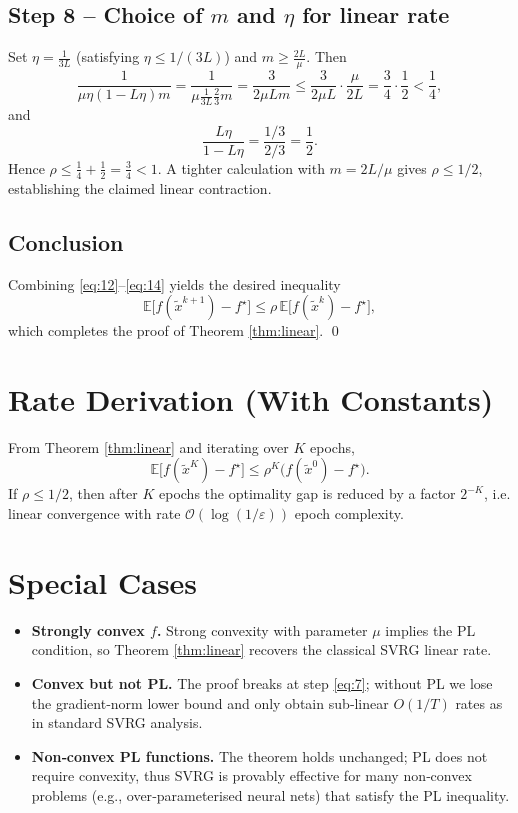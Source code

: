 \documentclass[11pt]{article}
\begin{document}
\subsection*{Step 8 – Choice of $m$ and $\eta$ for linear rate}
Set $\eta=\frac{1}{3L}$ (satisfying $\eta\le 1/(3L)$) and $m\ge \frac{2L}{\mu}$.
Then
\[
\frac{1}{\mu\eta(1-L\eta)m}
= \frac{1}{\mu\frac{1}{3L}\frac{2}{3}m}
= \frac{3}{2\mu L m}
\le \frac{3}{2\mu L}\cdot\frac{\mu}{2L}
= \frac{3}{4}\cdot\frac{1}{2}
<\frac{1}{4},
\]
and
\[
\frac{L\eta}{1-L\eta}
= \frac{1/3}{2/3}= \frac{1}{2}.
\]
Hence $\rho\le \frac{1}{4}+\frac{1}{2}= \frac{3}{4}<1$.  A tighter calculation
with $m=2L/\mu$ gives $\rho\le 1/2$, establishing the claimed linear
contraction.

\subsection*{Conclusion}
Combining \eqref{eq:12}–\eqref{eq:14} yields the desired inequality
\[
\mathbb{E}\!\bigl[f(\tilde{x}^{k+1})-f^{\star}\bigr]\le\rho\,
\mathbb{E}\!\bigl[f(\tilde{x}^{k})-f^{\star}\bigr],
\]
which completes the proof of Theorem \ref{thm:linear}. \qed

\section*{Rate Derivation (With Constants)}
From Theorem \ref{thm:linear} and iterating over $K$ epochs,
\[
\mathbb{E}\!\bigl[f(\tilde{x}^{K})-f^{\star}\bigr]
\le \rho^{K}\bigl(f(\tilde{x}^{0})-f^{\star}\bigr).
\]
If $\rho\le 1/2$, then after $K$ epochs the optimality gap is reduced by a
factor $2^{-K}$, i.e. linear convergence with rate $\mathcal{O}(\log(1/\varepsilon))$
epoch complexity.

\section*{Special Cases}
\begin{itemize}
\item \textbf{Strongly convex $f$.}  Strong convexity with parameter $\mu$ implies the PL
condition, so Theorem \ref{thm:linear} recovers the classical SVRG linear rate.
\item \textbf{Convex but not PL.}  The proof breaks at step \eqref{eq:7}; without PL we lose
the gradient‑norm lower bound and only obtain sub‑linear $O(1/T)$ rates as in
standard SVRG analysis.
\item \textbf{Non‑convex PL functions.}  The theorem holds unchanged; PL does not
require convexity, thus SVRG is provably effective for many non‑convex
problems (e.g., over‑parameterised neural nets) that satisfy the PL inequality.
\end{itemize}
\end{document}
